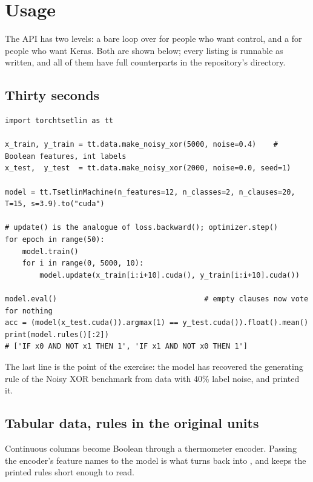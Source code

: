 \section{Usage}
\label{sec:usage}

The API has two levels: a bare loop over  for people who want control, and
a  for people who want Keras. Both are shown below; every listing is
runnable as written, and all of them have full counterparts in the repository's
 directory.

\subsection{Thirty seconds}

\begin{lstlisting}[style=ttpython]
import torchtsetlin as tt

x_train, y_train = tt.data.make_noisy_xor(5000, noise=0.4)    # Boolean features, int labels
x_test,  y_test  = tt.data.make_noisy_xor(2000, noise=0.0, seed=1)

model = tt.TsetlinMachine(n_features=12, n_classes=2, n_clauses=20, T=15, s=3.9).to("cuda")

# update() is the analogue of loss.backward(); optimizer.step()
for epoch in range(50):
    model.train()
    for i in range(0, 5000, 10):
        model.update(x_train[i:i+10].cuda(), y_train[i:i+10].cuda())

model.eval()                                  # empty clauses now vote for nothing
acc = (model(x_test.cuda()).argmax(1) == y_test.cuda()).float().mean()
print(model.rules()[:2])
# ['IF x0 AND NOT x1 THEN 1', 'IF x1 AND NOT x0 THEN 1']
\end{lstlisting}

The last line is the point of the exercise: the model has recovered the generating rule of
the Noisy XOR benchmark from data with 40\% label noise, and printed it.

\subsection{Tabular data, rules in the original units}

Continuous columns become Boolean through a thermometer encoder. Passing the encoder's
feature names to the model is what turns  back into ,
and  keeps the printed rules short enough to read.


